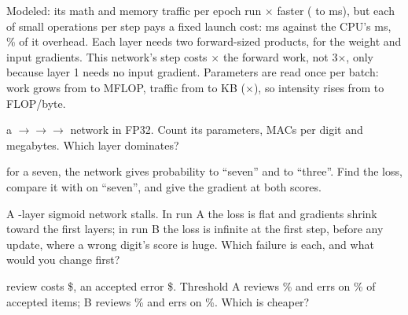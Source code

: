 \documentclass{studysheet}
\begin{document}
\begin{rightcol}
%
  {Modeled: its math and memory traffic per epoch run $\times$ faster ( to  ms),
   but each of  small operations per step pays a fixed launch cost:  ms against
   the CPU's  ms, \% of it overhead.}{}
%
  {Each layer needs two forward-sized products, for the weight and input gradients. This network's step
   costs $\times$ the forward work, not 3$\times$, only because layer 1 needs no input gradient.}{}
%
  {Parameters are read once per batch: work grows from  to  MFLOP, traffic
   from  to  KB ($\times$), so intensity rises from  to  FLOP/byte.}{}

\vspace{2pt}
\begin{qs}
\item \assumed{} a $\to$$\to$$\to$ network in FP32. Count its parameters,
  MACs per digit and megabytes. Which layer dominates?
\item \assumed{} for a seven, the network gives probability  to ``seven'' and  to ``three''. Find the loss,
  compare it with  on ``seven'', and give the gradient at both scores.
\item A -layer sigmoid network stalls. In run A the loss is flat and gradients shrink toward the first layers;
  in run B the loss is infinite at the first step, before any update, where a wrong digit's score is huge.
  Which failure is each, and what would you change first?
\item \assumed{} review costs \$, an accepted error \$. Threshold A reviews \%
  and errs on \% of accepted items; B reviews \% and errs on \%. Which is cheaper?
\end{qs}
\end{rightcol}
\end{document}
